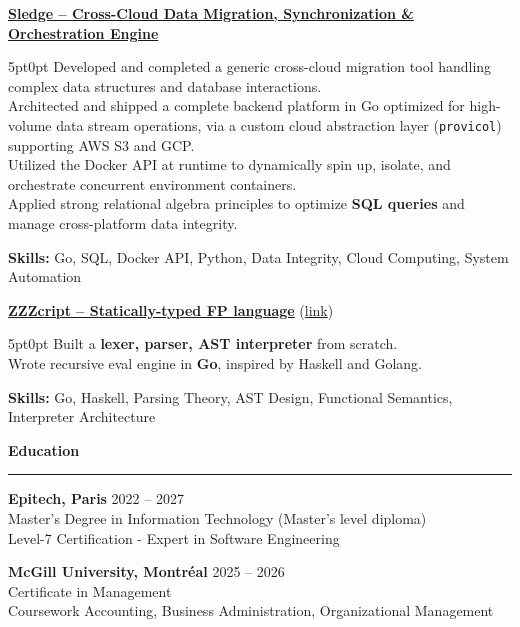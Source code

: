 \documentclass[9pt]{extarticle}
\begin{document}
\underline{\bfseries Sledge -- Cross-Cloud Data Migration, Synchronization \& Orchestration Engine}
\par
\begin{adjustwidth}{5pt}{0pt}
    Developed and completed a generic cross-cloud migration tool handling complex data structures and database interactions. \\
    Architected and shipped a complete backend platform in Go optimized for high-volume data stream operations, via a custom cloud abstraction layer (\texttt{provicol}) supporting AWS S3 and GCP. \\
    Utilized the Docker API at runtime to dynamically spin up, isolate, and orchestrate concurrent environment containers. \\
    Applied strong relational algebra principles to optimize {\bfseries SQL queries} and manage cross-platform data integrity.
\end{adjustwidth}
\par
{\bfseries Skills:} Go, SQL, Docker API, Python, Data Integrity, Cloud Computing, System Automation

\par\vspace{8pt}

\underline{\bfseries ZZZcript -- Statically-typed FP language} (\href{https://github.com/paulogarithm/zzzcript}{link})
\par
\begin{adjustwidth}{5pt}{0pt}
	Built a {\bfseries lexer, parser, AST interpreter} from scratch. \\
	Wrote recursive eval engine in {\bfseries Go}, inspired by Haskell and Golang.
\end{adjustwidth}
\par
{\bfseries Skills:} Go, Haskell, Parsing Theory, AST Design, Functional Semantics, Interpreter Architecture

\par\vspace{8pt}


{\large\bfseries Education}
\par\vspace{-8pt}
\rule{\linewidth}{0.4pt}
\par\vspace{5pt}

{\bfseries Epitech, Paris} \hfill 2022 -- 2027 \\
Master's Degree in Information Technology (Master's level diploma) \\
Level-7 Certification - Expert in Software Engineering

\vspace{6pt}

{\bfseries McGill University, Montréal} \hfill 2025 -- 2026 \\
Certificate in Management \\
Coursework Accounting, Business Administration, Organizational Management
\end{document}
